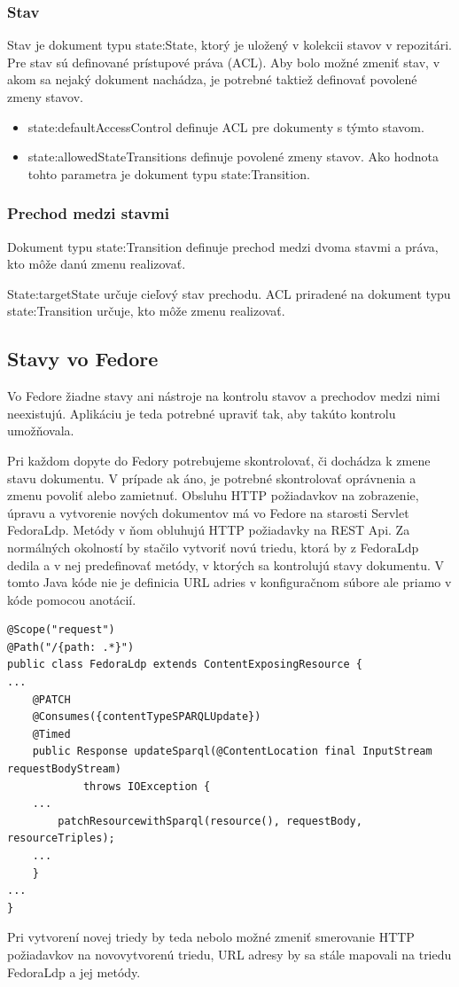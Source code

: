 \documentclass[thesis=M,slovak]{FITthesis}[2013/05/06]
\begin{document}
\subsubsection{Stav}
Stav je dokument typu state:State, ktorý je uložený v kolekcii stavov v repozitári. Pre stav sú definované prístupové práva (ACL). Aby bolo možné zmeniť stav, v akom sa nejaký dokument nachádza, je potrebné taktiež definovať povolené zmeny stavov.

\begin{itemize}
	\item state:defaultAccessControl definuje ACL pre dokumenty s týmto stavom.
	\item state:allowedStateTransitions definuje povolené zmeny stavov. Ako hodnota tohto parametra je dokument typu state:Transition.
\end{itemize}

\subsubsection{Prechod medzi stavmi}
Dokument typu state:Transition definuje prechod medzi dvoma stavmi a práva, kto môže danú zmenu realizovať.

State:targetState určuje cieľový stav prechodu.
ACL priradené na dokument typu state:Transition určuje, kto môže zmenu realizovať.

\subsection{Stavy vo Fedore}
Vo Fedore žiadne stavy ani nástroje na kontrolu stavov a prechodov medzi nimi neexistujú. Aplikáciu je teda potrebné upraviť tak, aby takúto kontrolu umožňovala.

Pri každom dopyte do Fedory potrebujeme skontrolovať, či dochádza k zmene stavu dokumentu. V prípade ak áno, je potrebné skontrolovať oprávnenia a zmenu povoliť alebo zamietnuť. Obsluhu HTTP požiadavkov na zobrazenie, úpravu a vytvorenie nových dokumentov má vo Fedore na starosti Servlet FedoraLdp. Metódy v ňom obluhujú HTTP požiadavky na REST Api. Za normálných okolností by stačilo vytvoriť novú triedu, ktorá by z FedoraLdp dedila a v nej predefinovať metódy, v ktorých sa kontrolujú stavy dokumentu. V tomto Java kóde nie je definicia URL adries v konfiguračnom súbore ale priamo v kóde pomocou anotácií. 
\lstset{language=Java}
\begin{lstlisting}[frame=single] 
@Scope("request")
@Path("/{path: .*}")
public class FedoraLdp extends ContentExposingResource {
...
    @PATCH
    @Consumes({contentTypeSPARQLUpdate})
    @Timed
    public Response updateSparql(@ContentLocation final InputStream requestBodyStream)
            throws IOException {
	...
		patchResourcewithSparql(resource(), requestBody, resourceTriples);
	...
    }
...
}
\end{lstlisting}
Pri vytvorení novej triedy by teda nebolo možné zmeniť smerovanie HTTP požiadavkov na novovytvorenú triedu, URL adresy by sa stále mapovali na triedu FedoraLdp a jej metódy.
\end{document}
